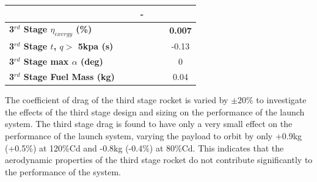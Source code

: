 \begin{table}[ht]
\begin{tabular}{l c c c c c c}
		& \secondFlightTimeCdThreeOneHundredTenNoReturn
		& \secondFlightTimeCdThreeOneHundredTwentyNoReturn
		& -
		\\
		\hline 
		\textbf{3$^{rd}$ Stage $\eta_{exergy}$ (\%)}
		& \textbf{\thirddExergyEffCdThreeEightyNoReturn}
		& \textbf{\thirddExergyEffCdThreeNinetyNoReturn}
		& \textbf{\thirddExergyEffCdThreeStandardNoReturn}
		& \textbf{\thirddExergyEffCdThreeOneHundredTenNoReturn}
		& \textbf{\thirddExergyEffCdThreeOneHundredTwentyNoReturn}
		& \textbf{0.007}
		\\
		\textbf{3$^{rd}$ Stage $t$, $q >$ 5kpa (s)}
		& \thirdqOverFiveCdThreeEightyNoReturn
		& \thirdqOverFiveCdThreeNinetyNoReturn
		& \thirdqOverFiveCdThreeStandardNoReturn
		& \thirdqOverFiveCdThreeOneHundredTenNoReturn
		& \thirdqOverFiveCdThreeOneHundredTwentyNoReturn
		&-0.13
		\\
		\textbf{3$^{rd}$ Stage max $\alpha$ (deg)}
		& \thirdmaxAoACdThreeEightyNoReturn
		& \thirdmaxAoACdThreeNinetyNoReturn
		& \thirdmaxAoACdThreeStandardNoReturn
		& \thirdmaxAoACdThreeOneHundredTenNoReturn
		& \thirdmaxAoACdThreeOneHundredTwentyNoReturn
		&0
		\\
		\textbf{3$^{rd}$ Stage Fuel Mass (kg)}
		& \thirdmFuelCdThreeEightyNoReturn
		& \thirdmFuelCdThreeNinetyNoReturn
		& \thirdmFuelCdThreeStandardNoReturn
		& \thirdmFuelCdThreeOneHundredTenNoReturn
		& \thirdmFuelCdThreeOneHundredTwentyNoReturn
		&0.04
		\\
		\hline 
	\end{tabular} 
	
	
\end{table}

The coefficient of drag of the third stage rocket is varied by $\pm20\%$ to investigate the effects of the third stage design and sizing on the performance of the launch system. The third stage drag is found to have only a very small effect on the performance of the launch system, varying the payload to orbit by only +0.9kg (+0.5\%) at 120\%Cd and -0.8kg (-0.4\%) at 80\%Cd. This indicates that the aerodynamic properties of the third stage rocket do not contribute significantly to the performance of the system. 

